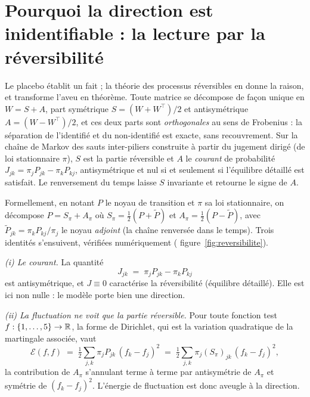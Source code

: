 
\section{Pourquoi la direction est inidentifiable : la lecture par la réversibilité}

Le placebo établit un fait ; la théorie des processus réversibles en donne la raison,
et transforme l'aveu en théorème. Toute matrice se décompose de façon unique en $W=S+A$, part
symétrique $S=(W+W^\top)/2$ et antisymétrique $A=(W-W^\top)/2$, et ces deux parts sont
\emph{orthogonales} au sens de Frobenius : la séparation de l'identifié et du non-identifié est
exacte, sans recouvrement. Sur la chaîne de Markov des sauts inter-piliers construite à partir
du jugement dirigé (de loi stationnaire $\pi$), $S$ est la partie réversible et $A$ le
\emph{courant} de probabilité $J_{jk}=\pi_j P_{jk}-\pi_k P_{kj}$, antisymétrique et nul si et
seulement si l'équilibre détaillé est satisfait. Le renversement du temps laisse $S$ invariante
et retourne le signe de $A$.

Formellement, en notant $P$ le noyau de transition et $\pi$ sa loi stationnaire, on décompose
$P = S_\pi + A_\pi$ où $S_\pi=\tfrac12(P+\tilde P)$ et $A_\pi=\tfrac12(P-\tilde P)$, avec
$\tilde P_{jk} = \pi_k P_{kj}/\pi_j$ le noyau \emph{adjoint} (la chaîne renversée dans le temps).
Trois identités s'ensuivent, vérifiées numériquement (%
figure~\ref{fig:reversibilite}).

\emph{(i) Le courant.} La quantité
\begin{equation}
  J_{jk} \;=\; \pi_j P_{jk} - \pi_k P_{kj}
  \label{eq:courant}
\end{equation}
est antisymétrique, et $J\equiv 0$ caractérise la réversibilité (équilibre détaillé). Elle est
ici non nulle : le modèle porte bien une direction.

\emph{(ii) La fluctuation ne voit que la partie réversible.} Pour toute fonction test
$f:\{1,\dots,5\}\to\mathbb{R}$, la forme de Dirichlet, qui est la variation quadratique de la martingale
associée, vaut
\begin{equation}
  \mathcal{E}(f,f) \;=\; \tfrac12\sum_{j,k}\pi_j P_{jk}\,(f_k-f_j)^2
                  \;=\; \tfrac12\sum_{j,k}\pi_j (S_\pi)_{jk}\,(f_k-f_j)^2 ,
  \label{eq:dirichlet}
\end{equation}
la contribution de $A_\pi$ s'annulant terme à terme par antisymétrie de $A_\pi$ et symétrie de
$(f_k-f_j)^2$. L'énergie de fluctuation est donc aveugle à la direction.

